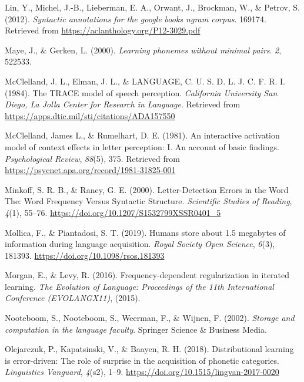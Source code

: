 \documentclass[
  man,floatsintext]{apa6}
\newlength{\cslhangindent}
\newlength{\cslentryspacingunit} %
\newenvironment{CSLReferences}[2] %
 {%
  \setlength{\parindent}{0pt}
  \ifodd #1
  \let\oldpar\par
  \def\par{\hangindent=\cslhangindent\oldpar}
  \fi
  \setlength{\parskip}{#2\cslentryspacingunit}
 }%
 {}
\begin{document}
\begin{CSLReferences}{1}{0}
\leavevmode{}%
Lin, Y., Michel, J.-B., Lieberman, E. A., Orwant, J., Brockman, W., \& Petrov, S. (2012). \emph{Syntactic annotations for the google books ngram corpus}. 169174. Retrieved from \url{https://aclanthology.org/P12-3029.pdf}

\leavevmode{}%
Maye, J., \& Gerken, L. (2000). \emph{Learning phonemes without minimal pairs}. \emph{2}, 522533.

\leavevmode{}%
McClelland, J. L., Elman, J. L., \& LANGUAGE, C. U. S. D. L. J. C. F. R. I. (1984). The TRACE model of speech perception. \emph{California University San Diego, La Jolla Center for Research in Language}. Retrieved from \url{https://apps.dtic.mil/sti/citations/ADA157550}

\leavevmode{}%
McClelland, James L., \& Rumelhart, D. E. (1981). An interactive activation model of context effects in letter perception: I. An account of basic findings. \emph{Psychological Review}, \emph{88}(5), 375. Retrieved from \url{https://psycnet.apa.org/record/1981-31825-001}

\leavevmode{}%
Minkoff, S. R. B., \& Raney, G. E. (2000). Letter-Detection Errors in the Word The: Word Frequency Versus Syntactic Structure. \emph{Scientific Studies of Reading}, \emph{4}(1), 55--76. \url{https://doi.org/10.1207/S1532799XSSR0401_5}

\leavevmode{}%
Mollica, F., \& Piantadosi, S. T. (2019). Humans store about 1.5 megabytes of information during language acquisition. \emph{Royal Society Open Science}, \emph{6}(3), 181393. \url{https://doi.org/10.1098/rsos.181393}

\leavevmode{}%
Morgan, E., \& Levy, R. (2016). Frequency-dependent regularization in iterated learning. \emph{The Evolution of Language: Proceedings of the 11th International Conference (EVOLANGX11)}, (2015).

\leavevmode{}%
Nooteboom, S., Nooteboom, S., Weerman, F., \& Wijnen, F. (2002). \emph{Storage and computation in the language faculty}. Springer Science \& Business Media.

\leavevmode{}%
Olejarczuk, P., Kapatsinski, V., \& Baayen, R. H. (2018). Distributional learning is error-driven: The role of surprise in the acquisition of phonetic categories. \emph{Linguistics Vanguard}, \emph{4}(s2), 1--9. \url{https://doi.org/10.1515/lingvan-2017-0020}


\end{CSLReferences}
\end{document}
